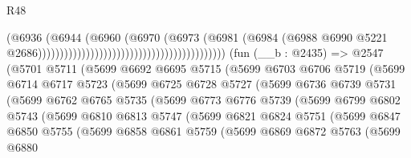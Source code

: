 \begin{lexlean}{R48}
\begin{coremodule}
                                                                          (@6936
                                                                            (@6944
                                                                              (@6960
                                                                                (@6970
                                                                                  (@6973
                                                                                    (@6981
                                                                                      (@6984
                                                                                        (@6988
                                                                                          @6990
                                                                                          @5221
                                                                                          @2686)))))))))))))))))))))))))))))))))))))))))))
    (fun (__b : @2435) =>
    @2547
      (@5701
        @5711
        (@5699
          @6692
          @6695
          @5715
          (@5699
            @6703
            @6706
            @5719
            (@5699
              @6714
              @6717
              @5723
              (@5699
                @6725
                @6728
                @5727
                (@5699
                  @6736
                  @6739
                  @5731
                  (@5699
                    @6762
                    @6765
                    @5735
                    (@5699
                      @6773
                      @6776
                      @5739
                      (@5699
                        @6799
                        @6802
                        @5743
                        (@5699
                          @6810
                          @6813
                          @5747
                          (@5699
                            @6821
                            @6824
                            @5751
                            (@5699
                              @6847
                              @6850
                              @5755
                              (@5699
                                @6858
                                @6861
                                @5759
                                (@5699
                                  @6869
                                  @6872
                                  @5763
                                  (@5699
                                    @6880

\end{coremodule}
\end{lexlean}
